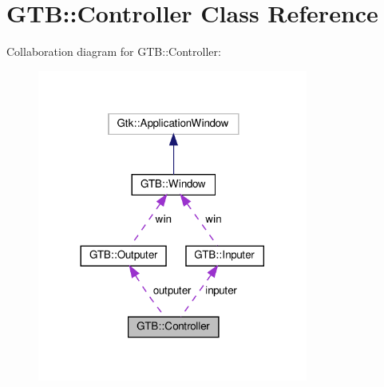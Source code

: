 \hypertarget{a00048}{}\section{G\+TB\+:\+:Controller Class Reference}
\label{a00048}


Collaboration diagram for G\+TB\+:\+:Controller\+:\nopagebreak
\begin{figure}[H]
\begin{center}
\leavevmode
\includegraphics[width=252pt]{a00046}
\end{center}
\end{figure}
